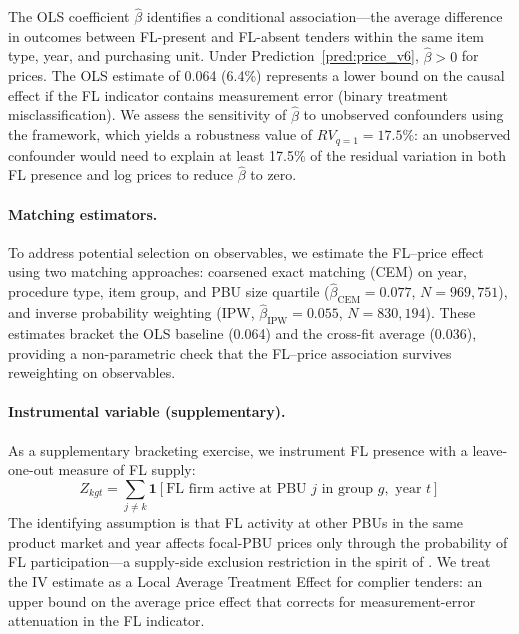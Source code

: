 The OLS coefficient $\hat{\beta}$ identifies a conditional
association---the average difference in outcomes between FL-present and
FL-absent tenders within the same item type, year, and purchasing unit.
Under Prediction~\ref{pred:price_v6}, $\hat{\beta} > 0$ for prices. The
OLS estimate of 0.064 (6.4\%) represents a lower bound on the causal
effect if the FL indicator contains measurement error (binary treatment
misclassification). We assess the sensitivity of $\hat{\beta}$ to
unobserved confounders using the \citet{cinelli2020making} framework,
which yields a robustness value of $RV_{q=1} = 17.5\%$: an unobserved
confounder would need to explain at least 17.5\% of the residual
variation in both FL presence and log prices to reduce $\hat{\beta}$ to
zero.

\paragraph{Matching estimators.} %
To address potential selection on observables, we estimate the
FL--price effect using two matching approaches: coarsened exact
matching (CEM) on year, procedure type, item group, and PBU size
quartile ($\hat{\beta}_{\text{CEM}} = 0.077$, $N = 969{,}751$), and
inverse probability weighting (IPW, $\hat{\beta}_{\text{IPW}} = 0.055$,
$N = 830{,}194$). These estimates bracket the OLS baseline (0.064)
and the cross-fit average (0.036), providing a non-parametric check
that the FL--price association survives reweighting on observables.

\paragraph{Instrumental variable (supplementary).} %
As a supplementary bracketing exercise, we instrument FL presence with
a leave-one-out measure of FL supply:
\begin{equation}
  Z_{kgt} = \sum_{j \neq k} \mathbf{1}[\text{FL firm active at PBU } j
  \text{ in group } g, \text{ year } t]
  \label{eq:iv_v6}
\end{equation}
The identifying assumption is that FL activity at other PBUs in the same
product market and year affects focal-PBU prices only through the
probability of FL participation---a supply-side exclusion restriction in
the spirit of \citet{goldsmithpinkham2020bartik}. We treat the IV
estimate as a Local Average Treatment Effect for complier tenders: an
upper bound on the average price effect that corrects for
measurement-error attenuation in the FL indicator.

